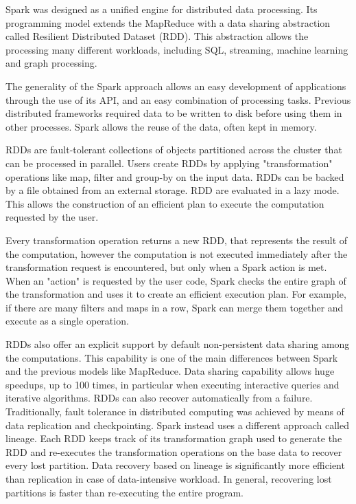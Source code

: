 Spark was designed as a unified engine for distributed data processing. Its programming model extends the MapReduce with a data sharing abstraction called Resilient Distributed Dataset (RDD). This abstraction allows the processing many different workloads, including SQL, streaming, machine learning and graph processing. 

The generality of the Spark approach allows an easy development of applications through the use of its API, and an easy combination of  processing tasks. Previous distributed frameworks required data to be written to disk before using them in other processes. Spark allows the reuse of the data, often kept in memory.

RDDs are fault-tolerant collections of objects partitioned across the cluster that can be processed in parallel. Users create RDDs by applying "transformation" operations like map, filter and group-by on the input data. RDDs can be backed by a file obtained from an external storage. RDD are evaluated in a lazy mode. This allows the construction of an efficient plan to execute the computation requested by the user. 

Every transformation operation returns a new RDD, that represents the result of the computation, however the computation is not executed immediately after the transformation request is encountered, but only when a Spark action is met. When an "action" is requested by the user code, Spark checks the entire graph of the transformation and uses it to create an efficient execution plan. For example, if there are many filters and maps in a row, Spark can merge them together and execute as a single operation.

RDDs also offer an explicit support by default non-persistent data sharing among the computations. This capability is one of the main differences between Spark and the previous  models like MapReduce. Data sharing capability allows huge speedups, up to 100 times, in particular when executing interactive queries and iterative algorithms.
RDDs can also recover automatically from a failure. Traditionally, fault tolerance in distributed computing was achieved by means of data replication and checkpointing. Spark instead uses a different approach called lineage. Each RDD keeps track of its transformation graph used to generate the RDD and re-executes the transformation operations on the base data to recover every lost partition. Data recovery based on lineage is significantly more efficient than replication in case of data-intensive workload. In general, recovering lost partitions is faster than re-executing the entire program. 

